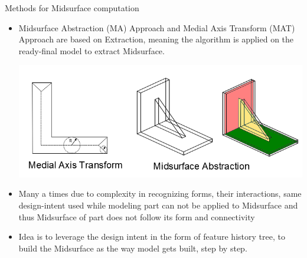 
\begin{frame}{Methods for Midsurface computation}
\begin{itemize}[noitemsep,label=\textbullet,topsep=2pt,parsep=2pt,partopsep=2pt]
\item Midsurface Abstraction (MA) Approach and Medial Axis Transform (MAT) Approach are based on Extraction, meaning the algorithm is applied on the ready-final model to extract Midsurface. 

\includegraphics[scale=0.25]{../Common/images/MAT_Midsurf.png}

\item Many a times due to complexity in recognizing forms, their interactions, same design-intent used while modeling part can not be applied to Midsurface and thus Midsurface of part does not follow its form and connectivity

\item Idea is to leverage the design intent in the form of feature history tree, to build the Midsurface as the way model gets built, step by step.
\end{itemize}


\end{frame}



